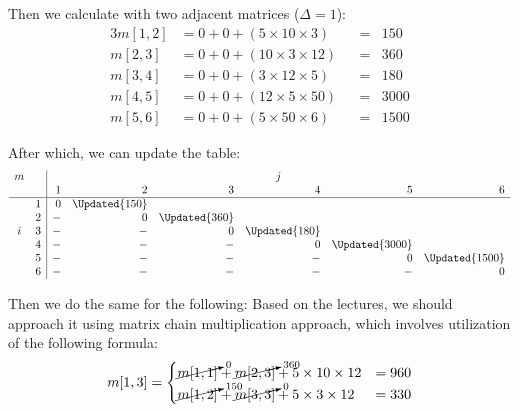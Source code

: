 Then we calculate with two adjacent matrices ($\Delta = 1$):
\begin{alignat*}{3}
    m[1,2] &= 0 + 0 + ( 5 \times 10 \times  3) &&= {} &  150 \\ 
    m[2,3] &= 0 + 0 + (10 \times  3 \times 12) &&= {} &  360 \\
    m[3,4] &= 0 + 0 + ( 3 \times 12 \times  5) &&= {} &  180 \\
    m[4,5] &= 0 + 0 + (12 \times  5 \times 50) &&= {} & 3000 \\
    m[5,6] &= 0 + 0 + ( 5 \times 50 \times  6) &&= {} & 1500
\end{alignat*}

After which, we can update the table:
\[
\begin{array}{cc|rrrrrr}
m &   & \multicolumn{6}{c}{j}                                                                  \\
  &   &  1   &      2        &       3       &       4       &       5        &       6        \\
\hline
  & 1 &  0   & \Updated{150} &               &               &                &                \\
  & 2 &  -   &      0        & \Updated{360} &               &                &                \\
i & 3 &  -   &      -        &       0       & \Updated{180} &                &                \\
  & 4 &  -   &      -        &       -       &       0       & \Updated{3000} &                \\
  & 5 &  -   &      -        &       -       &       -       &       0        & \Updated{1500} \\
  & 6 &  -   &      -        &       -       &       -       &       -        &       0
\end{array}
\]

Then we do the same for the following:
Based on the lectures, we should approach it using matrix chain multiplication
approach, which involves utilization of the following formula:
$$
    m[1, 3] =
    \begin{cases}
        \cancelto{0}{m[1, 1]}   + \cancelto{360}{m[2, 3]} + 5 \times 10 \times 12  & = 960 \\
        \cancelto{150}{m[1, 2]} + \cancelto{0}{m[3, 3]}   + 5 \times  3 \times 12  & = 330
    \end{cases}
$$


